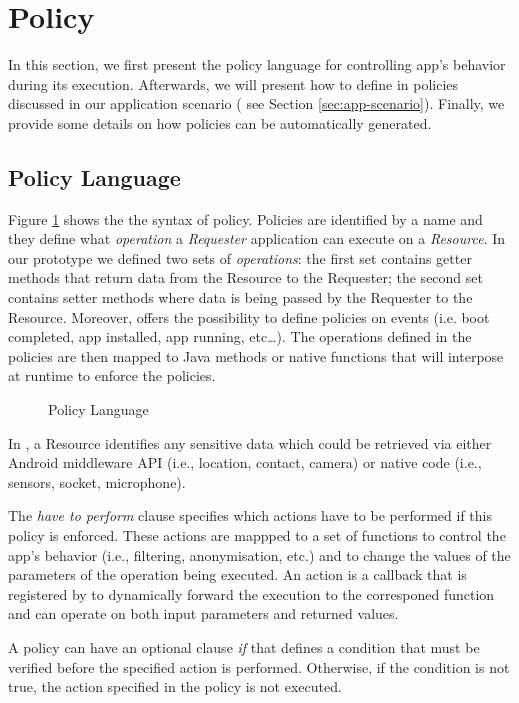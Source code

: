 \section{\asd Policy}
\label{sec:policy}
In this section, we first present the \asd policy language for controlling app's behavior during its execution. Afterwards, we will present  how to define in \asd policies discussed in our application scenario ( see Section \ref{sec:app-scenario}). Finally, we provide some details on how policies can be automatically generated. 

\subsection{Policy Language}
Figure \ref{fig:lang} shows the the syntax of \asd policy. Policies are identified by a name and they define what \textit{operation} a \textit{Requester} application can execute on a \textit{Resource}. In our prototype we defined two sets of \textit{operations}: the first set contains getter methods that return data from the Resource to the Requester; the second set contains  setter methods where data is being passed by the Requester to the Resource. Moreover, \asd offers the possibility to define policies on events (i.e. boot completed, app installed, app running, etc\ldots). The operations defined in the policies are then mapped to Java methods or native functions that \asd will interpose at runtime to enforce the policies.

\begin{figure}[ht!]
\centering

\caption{\asd Policy Language}
\label{fig:lang}
\end{figure}

In \asd, a Resource identifies any sensitive data which could be retrieved via either Android middleware API (i.e., location, contact, camera) or native code (i.e., sensors, socket, microphone). 
 
The \textit{have to perform} clause  specifies which actions have to be performed if this policy is enforced. These actions are mappped to a set of functions to control the app's behavior (i.e., filtering, anonymisation, etc.) and to change the values of the parameters of the operation being executed. An action is a callback that is registered by \asd to dynamically forward the execution to the corresponed function and  can operate on both input parameters and returned values. 

A policy can have an optional clause \textit{if} that defines a condition that must be verified before the specified action is performed. Otherwise, if the condition is not true, the action specified in the policy is not executed. 


